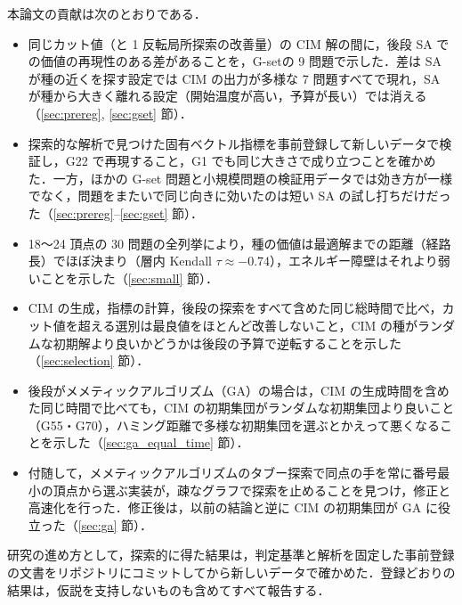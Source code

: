 本論文の貢献は次のとおりである．
\begin{itemize}
  \item 同じカット値（と 1 反転局所探索の改善量）の CIM 解の間に，後段 SA での価値の再現性のある差があることを，G-set\cite{helmberg2000}の 9 問題で示した．差は SA が種の近くを探す設定では CIM の出力が多様な 7 問題すべてで現れ，SA が種から大きく離れる設定（開始温度が高い，予算が長い）では消える（\ref{sec:prereg}, \ref{sec:gset} 節）．
  \item 探索的な解析で見つけた固有ベクトル指標を事前登録して新しいデータで検証し，G22 で再現すること，G1 でも同じ大きさで成り立つことを確かめた．一方，ほかの G-set 問題と小規模問題の検証用データでは効き方が一様でなく，問題をまたいで同じ向きに効いたのは短い SA の試し打ちだけだった（\ref{sec:prereg}--\ref{sec:gset} 節）．
  \item 18〜24 頂点の 30 問題の全列挙により，種の価値は最適解までの距離（経路長）でほぼ決まり（層内 Kendall $\tau\approx-0.74$），エネルギー障壁はそれより弱いことを示した（\ref{sec:small} 節）．
  \item CIM の生成，指標の計算，後段の探索をすべて含めた同じ総時間で比べ，カット値を超える選別は最良値をほとんど改善しないこと，CIM の種がランダムな初期解より良いかどうかは後段の予算で逆転することを示した（\ref{sec:selection} 節）．
  \item 後段がメメティックアルゴリズム（GA）の場合は，CIM の生成時間を含めた同じ時間で比べても，CIM の初期集団がランダムな初期集団より良いこと（G55・G70），ハミング距離で多様な初期集団を選ぶとかえって悪くなることを示した（\ref{sec:ga_equal_time} 節）．
  \item 付随して，メメティックアルゴリズムのタブー探索で同点の手を常に番号最小の頂点から選ぶ実装が，疎なグラフで探索を止めることを見つけ，修正と高速化を行った．修正後は，以前の結論と逆に CIM の初期集団が GA に役立った（\ref{sec:ga} 節）．
\end{itemize}

研究の進め方として，探索的に得た結果は，判定基準と解析を固定した事前登録の文書をリポジトリにコミットしてから新しいデータで確かめた．登録どおりの結果は，仮説を支持しないものも含めてすべて報告する．
